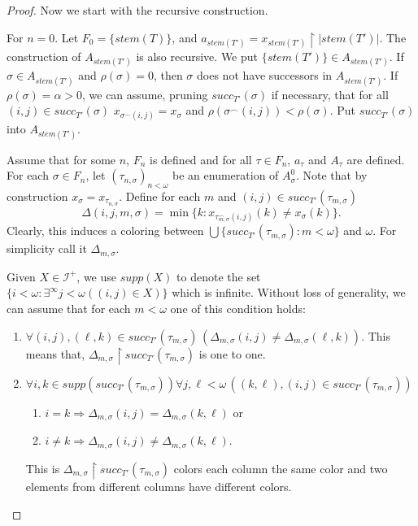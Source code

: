 \documentclass{amsart}
\theoremstyle{definition}
\theoremstyle{remark}
\numberwithin{equation}{section}
\newcommand{\id}{\mathcal{I}}
\newcommand{\restr}[2]{#1\upharpoonright {#2}}
\begin{document}
\begin{proof}
Now we start with the recursive construction. 

    For $n=0$. Let $F_0=\{stem(T)\}$, and $a_{stem(T')}=\restr{x_{stem(T')}}{|stem(T')|}$. The construction of $A_{stem(T')}$ is also recursive. We put $\{stem(T')\}\in A_{stem(T')}$. If $\sigma\in A_{stem(T')}$ and $\rho(\sigma)=0$, then $\sigma$ does not have successors in $A_{stem(T')}$. If $\rho(\sigma)=\alpha>0$, we can assume, pruning $succ_{T'}(\sigma)$ if necessary, that  for all $(i,j)\in succ_{T'}(\sigma)$ $x_{\sigma^\frown (i,j)}=x_\sigma$ and $\rho(\sigma^\frown(i,j))<\rho(\sigma)$. Put $succ_{T'}(\sigma)$ into $A_{stem(T')}$.

    Assume that for some $n$, $F_n$ is defined and for all $\tau\in F_n$, $a_\tau$ and $A_\tau$ are defined. For each $\sigma\in F_n$,  let $(\tau_{n,\sigma})_{n<\omega}$ be an enumeration of $A_\sigma^0$. Note that by construction $x_\sigma=x_{\tau_{n,\sigma}}$. Define for each $m$ and $(i,j)\in succ_{T'}(\tau_{m,\sigma})$ 
    \[
    \Delta(i,j,m,\sigma)= \min\{k:x_{\tau_{m,\sigma}^\frown(i,j)}(k)\not=x_{\sigma}(k)\}.
    \]
    Clearly, this induces a coloring between $\bigcup\{succ_{T'}(\tau_{m,\sigma}):m<\omega \}$ and $\omega$. For simplicity call it $\Delta_{m,\sigma}$.

    Given $X\in\id^+$, we use $supp(X)$ to denote the set $\{i<\omega: \exists^{\infty}j<\omega ((i,j)\in X)\}$ which is infinite. Without loss of generality, we can assume that for each $m<\omega$ one of this condition holds:

    \begin{enumerate}
        \item $\forall (i,j),(\ell,k)\in succ_{T'}(\tau_{m,\sigma})\,(\Delta_{m,\sigma}(i,j)\not =\Delta_{m,\sigma}(\ell,k))$. This means that, $\restr{\Delta_{m,\sigma}}{succ_{T'}(\tau_{m,\sigma})}$ is one to one. 
        \item $\forall i,k\in supp(succ_{T'}(\tau_{m,\sigma}))\forall j,\ell<\omega \, ((k,\ell),(i,j)\in succ_{T'}(\tau_{m,\sigma}))$
        \begin{enumerate}
            \item $i=k \Rightarrow
            \Delta_{m,\sigma}(i,j) =\Delta_{m,\sigma}(k,\ell)$ or
            \item $i\not=k \Rightarrow \Delta_{m,\sigma}(i,j)\not=\Delta_{m,\sigma}(k,\ell)$.
        \end{enumerate}
        This is $\restr{\Delta_{m,\sigma}}{succ_{T'}(\tau_{m,\sigma})}$ colors each column the same color and two elements from different columns have different colors.
    \end{enumerate}


\end{proof}
\end{document}
